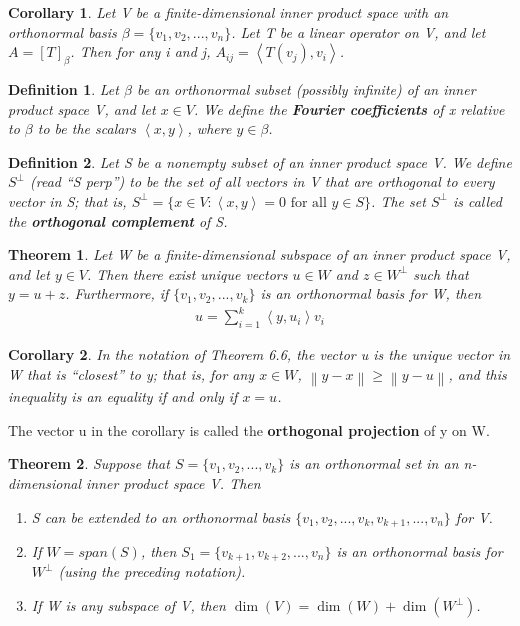 \documentclass{article}
\newcommand{\norm}[1]{\left\lVert#1\right\rVert}
\newcommand{\bd}[1]{\textbf{#1}}
\newcommand{\ip}[1]{\left\langle {#1}\right\rangle} %
\newcommand{\enumalph}[0]{\begin{enumerate}[label=(\alph*)]}
\theoremstyle{plain}
\newtheorem{theorem}{Theorem}[section]
\newtheorem*{corollary}{Corollary}
\newtheorem*{definition1}{Definition}
\theoremstyle{plain} %
\begin{document}
\begin{corollary}
  Let V be a finite-dimensional inner product space with an orthonormal basis $\beta = \{v_1, v_2,...,v_n\}$. Let T be a linear operator on V, and let $A = [T]_\beta$. Then for any i and j, $A_{ij} = \ip{T(v_j), v_i}$.
\end{corollary}

\begin{definition1}
  Let $\beta$ be an orthonormal subset (possibly infinite) of an
inner product space V, and let $x \in V$. We define the \bd{Fourier coefficients} of x relative to $\beta$ to be the scalars $\ip{x, y}$, where $y \in \beta$.
\end{definition1}

\begin{definition1}
  Let S be a nonempty subset of an inner product space V. We define $S^\perp$ (read “S perp”) to be the set of all vectors in V that are orthogonal to every vector in S; that is, $S^\perp = \{x \in V: \ip{x, y} = 0\text{ for all }y \in S\}$. The set $S^\perp$ is called the \bd{orthogonal complement} of S.
\end{definition1}

\begin{theorem}
  Let W be a finite-dimensional subspace of an inner product space V, and let $y \in V$. Then there exist unique vectors $u \in W$ and $z \in W^\perp$ such that $y = u + z$. Furthermore, if $\{v_1, v_2,...,v_k\}$ is an orthonormal basis for W, then
  \begin{align*}
    u=\sum_{i=1}^k \ip{y, u_i}v_i
  \end{align*}
\end{theorem}

\begin{corollary}
  In the notation of Theorem 6.6, the vector u is the unique vector in W that is “closest” to y; that is, for any $x \in W$, $\norm{y − x}\geq \norm{y − u}$, and this inequality is an equality if and only if $x = u$.
\end{corollary}

The vector u in the corollary is called the \bd{orthogonal projection} of y on W.

\begin{theorem}
  Suppose that $S = \{v_1, v_2,...,v_k\}$ is an orthonormal set in an n-dimensional inner product space V. Then
  \enumalph
    \item S can be extended to an orthonormal basis $\{v_1, v_2,... ,v_k, v_{k+1},... ,v_n\}$ for V.
    \item If $W = span(S)$, then $S_1 = \{v_{k+1}, v_{k+2},...,v_n\}$ is an orthonormal basis for $W^\perp$ (using the preceding notation).
    \item If W is any subspace of V, then $\dim(V) = \dim(W) + \dim(W^\perp)$.
  \end{enumerate}
\end{theorem}
\end{document}
